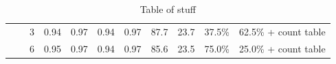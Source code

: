 \begin{table}[t]
\begin{tabular}{*{10}{|c}|c|}
                             &                            & 3                            & 0.94                                  & 0.97                                & 0.94                                & 0.97                               & 87.7           & 23.7           & 37.5\% & 62.5\% + count table \\
                             &                            & 6                            & 0.95                                  & 0.97                                & 0.94                                & 0.97                               & 85.6           & 23.5           & 75.0\% & 25.0\% + count table \\
    \hline
  \end{tabular}
  \caption{Table of stuff}
  \label{tab:comparison}
\end{table}